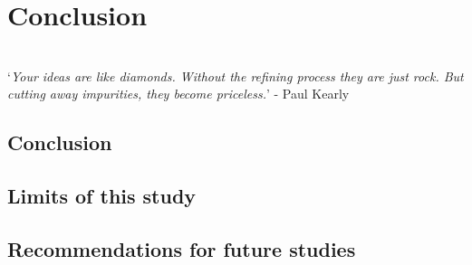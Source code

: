 \chapter{Conclusion}
\vspace{38em}

\hrulefill
\\
\enquote*{\textit{Your ideas are like diamonds. Without the refining process they are just rock. But cutting away impurities, they become priceless.}} - Paul Kearly\\
\newpage
	 \section{Conclusion}
	 \section{Limits of this study}
	 \section{Recommendations for future studies}